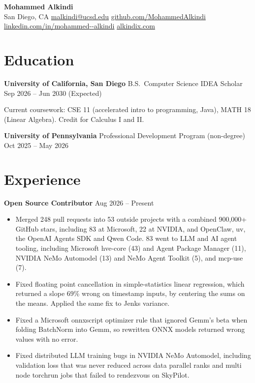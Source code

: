 \documentclass[10pt,letterpaper]{article}
\newcommand{\entry}[2]{%
  \par\noindent #1 \hfill {\color{soft}\small #2}\par
  \vspace{0.12em}
}
\begin{document}
\raggedright

\begin{center}
  {\fontsize{19}{22}\selectfont\bfseries Mohammed Alkindi}\\[0.4em]
  {\small\color{soft}
    San Diego, CA \textbar{}
    \href{mailto:malkindi@ucsd.edu}{malkindi@ucsd.edu} \textbar{}
    \href{https://github.com/MohammedAlkindi}{github.com/MohammedAlkindi} \textbar{}
    \href{https://www.linkedin.com/in/mohammed--alkindi/}{linkedin.com/in/mohammed{-}{-}alkindi} \textbar{}
    \href{https://www.alkindix.com}{alkindix.com}}
\end{center}
\vspace{-0.15em}

\section{Education}

\entry{\textbf{University of California, San Diego} \textbar{} B.S.\ Computer Science \textbar{} IDEA Scholar}{Sep 2026 -- Jun 2030 (Expected)}
{\small Current coursework: CSE 11 (accelerated intro to programming, Java), MATH 18 (Linear Algebra). Credit for Calculus I and II.}\par
\vspace{0.2em}
\entry{\textbf{University of Pennsylvania} \textbar{} Professional Development Program (non-degree)}{Oct 2025 -- May 2026}

\section{Experience}

\entry{\textbf{Open Source Contributor}}{Aug 2026 -- Present}
\begin{itemize}
  \item Merged 248 pull requests into 53 outside projects with a combined 900,000+ GitHub stars, including 83 at Microsoft,
        22 at NVIDIA, and OpenClaw, uv, the OpenAI Agents SDK and Qwen Code. 83 went to LLM and AI agent tooling, including
        Microsoft hve-core (43) and Agent Package Manager (11), NVIDIA NeMo Automodel (13) and NeMo Agent Toolkit (5), and mcp-use (7).
  \item Fixed floating point cancellation in simple-statistics linear regression, which returned a slope 69\% wrong on
        timestamp inputs, by centering the sums on the means. Applied the same fix to Jenks variance.
  \item Fixed a Microsoft onnxscript optimizer rule that ignored Gemm's beta when folding BatchNorm into Gemm, so
        rewritten ONNX models returned wrong values with no error.
  \item Fixed distributed LLM training bugs in NVIDIA NeMo Automodel, including validation loss that was never reduced
        across data parallel ranks and multi node torchrun jobs that failed to rendezvous on SkyPilot.
\end{itemize}
\end{document}
